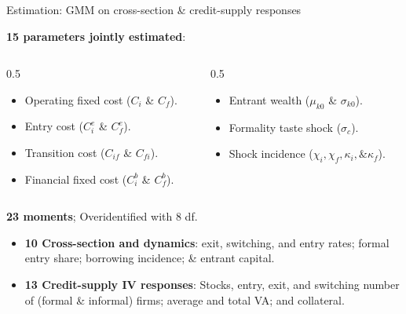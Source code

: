 \documentclass[aspectratio=169]{beamer}
\begin{document}
\begin{frame}{Estimation: GMM on cross-section \& credit-supply responses}

\textbf{15 parameters jointly estimated}: 

\begin{columns}
    \begin{column}{0.5\textwidth} 
        \begin{itemize}
            \item Operating fixed cost ($C_i$ \& $C_f$).
            \item Entry cost ($C^e_i$ \& $C^e_f$).
            \item Transition cost ($C_{if}$ \& $C_{fi}$).
            \item Financial fixed cost ($C^b_i$ \& $C^b_f$).
        \end{itemize}
    \end{column}

    \begin{column}{0.5\textwidth} 
        \begin{itemize}
            \item Entrant wealth ($\mu_{k0}$ \& $\sigma_{k0}$).
            \item Formality taste shock ($\sigma_c$).
            \item Shock incidence ($\chi_i, \chi_f, \kappa_i, \& \kappa_f$).
        \end{itemize}
    \end{column}
\end{columns}

\vspace{10mm}\pause

\textbf{23 moments}; Overidentified with 8 df.
\begin{itemize}
    \item \textbf{10 Cross-section and dynamics}: exit, switching, and entry rates; formal entry share; borrowing incidence; \& entrant capital.
    \item \textbf{13 Credit-supply IV responses}: Stocks, entry, exit, and switching number of (formal \& informal) firms; average and total VA; and collateral.
\end{itemize}

\end{frame}
\end{document}

